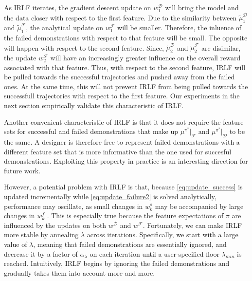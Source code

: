 \documentclass[a4paper,11pt]{report}
\begin{document}
As IRLF iterates, the gradient descent update on $w^{\mathcal{D}}_1$ will bring the model and the data closer with respect to the first feature. Due to the similarity between $\widetilde{\mu}^{\mathcal{D}}_1$ and $\widetilde{\mu}^{\mathcal{F}}_1$, the analytical update on $w^{\mathcal{F}}_1$ will be smaller. Therefore, the inluence of the failed demonstrations with respect to that feature will be small. The opposite will happen with respect to the second feature. Since, $\widetilde{\mu}^{\mathcal{D}}_2$ and $\widetilde{\mu}^{\mathcal{F}}_2$ are disimilar, the update $w^{\mathcal{F}}_2$ will have an increasingly greater influence on the overall reward associated with that feature.  Thus, with respect to the second feature, IRLF will be pulled towards the successful trajectories and pushed away from the failed ones.  At the same time, this will not prevent IRLF from being pulled towards the successfull trajectories with respect to the first feature.  Our experiments in the next section empirically validate this characteristic of IRLF.

Another convenient characteristic of IRLF is that it does not require the feature sets for successful and failed demonstrations that make up $ \mu^{\pi^*}|_{\mathcal{F}}$ and $ \mu^{\pi^*}|_{\mathcal{D}}$ to be the same. A designer is therefore free to represent failed demonstrations with a different feature set that is more informative than the one used for succesful demonstrations. Exploiting this property in practice is an interesting direction for future work.

However, a potential problem with IRLF is that, because \eqref{eq:update_success} is updated incrementally while \eqref{eq:update_failure2} is solved analytically, performance may oscillate, as small changes in $w^s_k$ may be accompanied by large changes in $w^f_k$ 
.
This is especially true because the feature expectations of $\pi$ are influenced by the updates on both $w^{\mathcal{D}}$ and $w^{\mathcal{F}}$. Fortunately, we can make IRLF more stable by annealing $\lambda$ across iterations.  Specifically, we start with a large value of $\lambda$, meaning that failed demonstrations are essentially ignored, and decrease it by a factor of $\alpha_{\lambda}$ 
on each iteration until a user-specified floor $\lambda_{min}$ 
is reached.  Intuitively, IRLF begins by ignoring the failed demonstrations and gradually takes them into account more and more.
\end{document}
